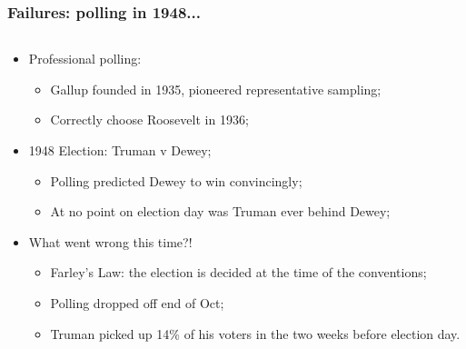 \documentclass[aspectratio=169]{beamer}
\theoremstyle{principle}
\begin{document}
\begin{frame}
\frametitle{Failures: polling in 1948...}

\begin{columns}
\begin{column}{0.5\textwidth}

\begin{itemize}
\item Professional polling:
\begin{itemize}
\item Gallup founded in 1935, pioneered representative sampling;
\item Correctly choose Roosevelt in 1936;
\end{itemize}

\item 1948 Election: Truman v Dewey;
\begin{itemize}
\item Polling predicted Dewey to win convincingly;
\item At no point on election day was Truman ever behind Dewey;
\end{itemize}

\item What went wrong this time?!
\begin{itemize}
\item[]\color{white} Farley's Law: the election is decided at the time of the conventions;
\item[]\color{white} Polling dropped off end of Oct;
\item[]\color{white} Truman picked up 14\% of his voters in the two weeks before election day.
\end{itemize}
\end{itemize}

\end{column}


\end{columns}
\end{frame}
\end{document}
